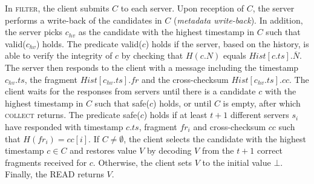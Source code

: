 \documentclass[10pt,conference,compsocconf]{IEEEtran}
\newcommand{\nonce}{N}
\newcommand{\hash}{\overline{N}}
\begin{document}
In \textsc{filter}, the client submits $C$ to each server. Upon reception of $C$, the server performs a write-back of the candidates in $C$ (\emph{metadata write-back}). In addition, the server picks $c_{hv}$ as the candidate with the highest timestamp in $C$ such that \textsf{valid}($c_{hv}$) holds. The predicate \textsf{valid}($c$) holds if the server, based on the history, is able to verify the integrity of $c$ by checking that $H(c.\nonce)$ equals $Hist[c.ts].\hash$. The server then responds to the client with a message including the timestamp $c_{hv}.ts$, the fragment $Hist[c_{hv}.ts].fr$ and the cross-checksum $Hist[c_{hv}.ts].cc$. The client waits for the responses from servers until there is a candidate $c$ with the highest timestamp in $C$ such that \textsf{safe}($c$) holds, or until $C$ is empty, after which \textsc{collect} returns. The predicate \textsf{safe}($c$) holds if at least $t+1$ different servers $s_i$ have responded with timestamp $c.ts$, fragment $fr_i$ and cross-checksum $cc$ such that $H(fr_i) = cc[i]$. If $C \neq \emptyset$, the client selects the candidate with the highest timestamp $c \in C$ and restores value $V$ by decoding $V$ from the $t+1$ correct fragments received for $c$. Otherwise, the client sets $V$ to the initial value $\bot$. Finally, the \textsc{READ} returns $V$.
\end{document}

